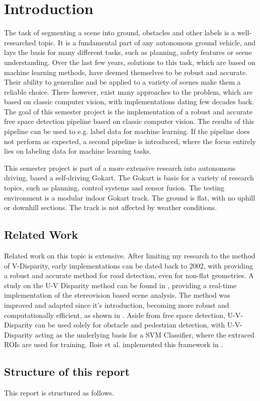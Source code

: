 
\chapter{Introduction}
\label{chp:Introduction}

The task of segmenting a scene into ground, obstacles and other labels is a well-researched topic. It is a fundamental part of any autonomous ground vehicle, and lays the basis for many different tasks, such as planning, safety features or scene understanding. Over the last few years, solutions to this task, which are based on machine learning methods, have deemed themselves to be robust and accurate. Their ability to generalise and be applied to a variety of scenes make them a reliable choice. There however, exist many approaches to the problem, which are based on classic computer vision, with implementations dating few decades back. \newline
The goal of this semester project is the implementation of a robust and accurate free space detection pipeline based on classic computer vision. The results of this pipeline can be used to e.g. label data for machine learning. If the pipeline does not perform as expected, a second pipeline is introduced, where the focus entirely lies on labeling data for machine learning tasks. 

This semester project is part of a more extensive research into autonomous driving, based a self-driving Gokart. The Gokart is basis for a variety of research topics, such as planning, control systems and sensor fusion. The testing environment is a modular indoor Gokart track. The ground is flat, with no uphill or downhill sections. The track is not affected by weather conditions. 
\newline


\section{Related Work}
Related work on this topic is extensive. After limiting my research to the method of V-Disparity, early implementations can be dated back to 2002, with \cite{V-disparity_nonflat} providing a robust and accurate method for road detection, even for non-flat geometries. A study on the U-V Disparity method can be found in \cite{Hu2005}, providing a real-time implementation of the stereovision based scene analysis. The method was improved and adapted since it's introduction, becoming more robust and computationally efficient, as shown in \cite{Kakegawa2018}. Aside from free space detection, U-V-Disparity can be used solely for obstacle and pedestrian detection, with U-V-Disparity acting as the underlying basis for a SVM Classifier, where the extraced ROIs are used for training. Iloie et al. implemented this framework in \cite{Iloie2014}.

\section{Structure of this report}
This report is structured as follows. 
